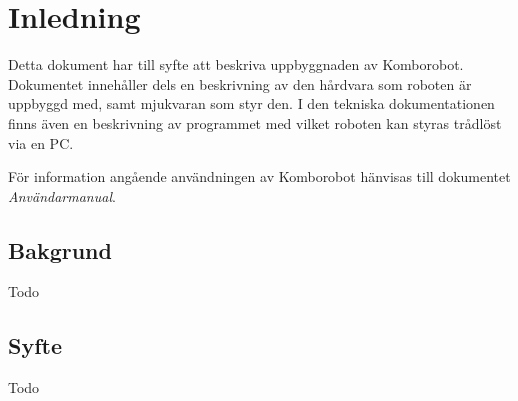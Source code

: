 
%
%


\section{Inledning}
Detta dokument har till syfte att beskriva uppbyggnaden av Komborobot. Dokumentet innehåller dels en beskrivning av den hårdvara som roboten är uppbyggd med, samt mjukvaran som styr den. I den tekniska dokumentationen finns även en beskrivning av programmet med vilket roboten kan styras trådlöst via en PC. 

För information angående användningen av Komborobot hänvisas till dokumentet \emph{Användarmanual}. 

\subsection{Bakgrund}
Todo
\subsection{Syfte}
Todo
